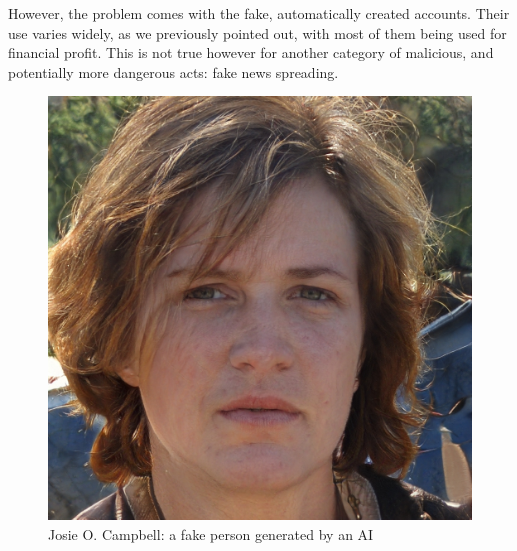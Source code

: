 However, the problem comes with the fake, automatically created accounts. Their use varies widely, as we previously pointed out, with most of them being used for financial profit. This is not true however for another category of malicious, and potentially more dangerous acts: fake news spreading.

\begin{figure}
    \includegraphics[width=0.5 \linewidth]{02_RiseOfFakeIdentities/image.jpg}
    \caption{Josie O. Campbell: a fake person generated by an AI}
    \label{fig:fakeperson}
\end{figure}
